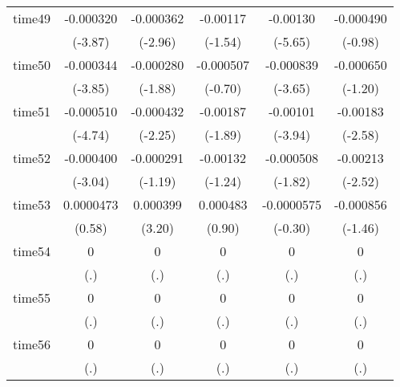 \begin{table}[htbp]
\begin{tabular}{l*{5}{c}}
time49      &   -0.000320\sym{***}&   -0.000362\sym{**} &    -0.00117         &    -0.00130\sym{***}&   -0.000490         \\
            &     (-3.87)         &     (-2.96)         &     (-1.54)         &     (-5.65)         &     (-0.98)         \\
time50      &   -0.000344\sym{***}&   -0.000280         &   -0.000507         &   -0.000839\sym{***}&   -0.000650         \\
            &     (-3.85)         &     (-1.88)         &     (-0.70)         &     (-3.65)         &     (-1.20)         \\
time51      &   -0.000510\sym{***}&   -0.000432\sym{*}  &    -0.00187         &    -0.00101\sym{***}&    -0.00183\sym{**} \\
            &     (-4.74)         &     (-2.25)         &     (-1.89)         &     (-3.94)         &     (-2.58)         \\
time52      &   -0.000400\sym{**} &   -0.000291         &    -0.00132         &   -0.000508         &    -0.00213\sym{*}  \\
            &     (-3.04)         &     (-1.19)         &     (-1.24)         &     (-1.82)         &     (-2.52)         \\
time53      &   0.0000473         &    0.000399\sym{**} &    0.000483         &  -0.0000575         &   -0.000856         \\
            &      (0.58)         &      (3.20)         &      (0.90)         &     (-0.30)         &     (-1.46)         \\
time54      &           0         &           0         &           0         &           0         &           0         \\
            &         (.)         &         (.)         &         (.)         &         (.)         &         (.)         \\
time55      &           0         &           0         &           0         &           0         &           0         \\
            &         (.)         &         (.)         &         (.)         &         (.)         &         (.)         \\
time56      &           0         &           0         &           0         &           0         &           0         \\
            &         (.)         &         (.)         &         (.)         &         (.)         &         (.)         \\

\end{tabular}
\end{table}
